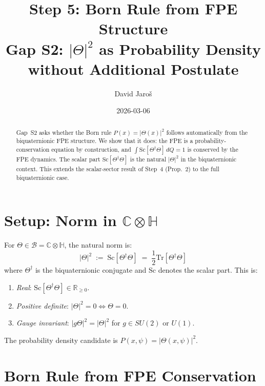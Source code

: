\documentclass[12pt,a4paper]{article}
\title{\textbf{Step 5: Born Rule from FPE Structure}\\
         \large Gap S2: $|\Theta|^2$ as Probability Density without Additional Postulate}
\author{David Jaro\v{s}}
\date{2026-03-06}
\theoremstyle{definition}
\theoremstyle{remark}
\begin{document}
  \maketitle

  \begin{abstract}
  Gap~S2 asks whether the Born rule $P(x) = |\Theta(x)|^2$ follows
  automatically from the biquaternionic FPE structure.  We show that
  it does: the FPE is a probability-conservation equation by construction,
  and $\int \mathrm{Sc}[\Theta^\dagger\Theta]\,dQ = 1$ is conserved by
  the FPE dynamics.  The scalar part $\mathrm{Sc}[\Theta^\dagger\Theta]$
  is the natural $|\Theta|^2$ in the biquaternionic context.
  This extends the scalar-sector result of Step~4 (Prop.~2) to the full
  biquaternionic case.
  \end{abstract}
\fi

\section{Setup: Norm in $\mathbb{C}\otimes\mathbb{H}$}
\label{sec:setup}

For $\Theta \in \mathcal{B} = \mathbb{C}\otimes\mathbb{H}$, the natural
norm is:
\begin{equation}
  |\Theta|^2 \;:=\; \mathrm{Sc}[\Theta^\dagger\Theta]
             \;=\; \frac{1}{2}\mathrm{Tr}[\Theta^\dagger\Theta]
  \label{eq:norm}
\end{equation}
where $\Theta^\dagger$ is the biquaternionic conjugate and $\mathrm{Sc}$
denotes the scalar part.  This is:
\begin{enumerate}
  \item \emph{Real}: $\mathrm{Sc}[\Theta^\dagger\Theta] \in \mathbb{R}_{\geq 0}$.
  \item \emph{Positive definite}: $|\Theta|^2 = 0 \Leftrightarrow \Theta = 0$.
  \item \emph{Gauge invariant}: $|g\Theta|^2 = |\Theta|^2$ for $g \in SU(2)$ or $U(1)$.
\end{enumerate}
The probability density candidate is $P(x,\psi) = |\Theta(x,\psi)|^2$.

\section{Born Rule from FPE Conservation}
\label{sec:born}
\end{document}

